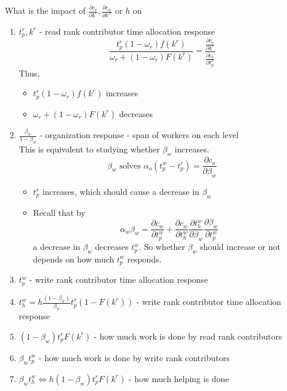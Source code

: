 \documentclass[source/paper/main.tex]{subfiles}
\begin{document}
What is the impact of $\frac{\partial c_r}{\partial k^r}, \frac{\partial c_w}{\partial k^w}$ or $h$  on
\begin{enumerate}
    \item $t_p^r, k^r$ - read rank contributor time allocation response\\
    $$\frac{t_p^r(1-\omega_r)f(k^r)}{\omega_r + (1-\omega_r) F(k^r)} = \frac{\frac{\partial c_r}{\partial k^r}}{\frac{\partial c_r}{\partial t_p^r}}$$
    Thus, 
    \begin{itemize}
        \item $t_p^r(1-\omega_r)f(k^r)$ increases
        \item $\omega_r + (1-\omega_r) F(k^r)$ decreases
    \end{itemize}
    \item $\frac{\beta_w}{1-\beta_w}$ - organization response - span of workers on each level\\
    This is equivalent to studying whether $\beta_w$ increases. 
    $$\beta_w \text{ solves } \alpha_o (t_p^w - t_p^r) = \frac{\partial c_o}{\partial \beta_w} $$
    \begin{itemize}
        \item $t_p^r$ increases, which should cause a decrease in $\beta_w$
        \item Recall that by $$\alpha_w \beta_w = \frac{\partial c_w}{\partial t_p^w} + \frac{\partial c_w}{\partial t_h^w}\frac{\partial t_h^w}{\partial \beta_w}\frac{\partial \beta_w}{\partial t_p^w}$$
        a decrease in $\beta_w$ decreases $t_p^w$. So whether $\beta_w$ should increase or not depends on how much $t_p^w$ responds. 
    \end{itemize}
    \item $t_p^w$ - write rank contributor time allocation response
    \item $t_h^w = h \frac{(1-\beta_w)}{\beta_w} t_p^r(1-F(k^r))$ - write rank contributor time allocation response
    \item $(1-\beta_w) t_p^r F(k^r)$ - how much work is done by read rank contributors
    \item $\beta_w t_p^w$ - how much work is done by write rank contributors
    \item $\beta_w t_h^w \iff h (1-\beta_w) t_p^rF(k^r)$ - how much helping is done 
\end{enumerate}
\end{document}
